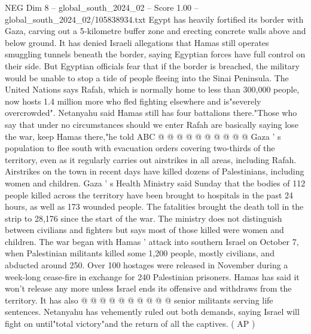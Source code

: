 \begin{textsample}{NEG Dim 8 – global\_south\_2024\_02 – Score 1.00 – global\_south\_2024\_02/105838934.txt}
Egypt has heavily fortified its border with Gaza, carving out a 5-kilometre buffer zone and erecting concrete walls above and below ground.
It has denied Israeli allegations that Hamas still operates smuggling tunnels beneath the border, saying Egyptian forces have full control on their side.
But Egyptian officials fear that if the border is breached, the military would be unable to stop a tide of people fleeing into the Sinai Peninsula.
The United Nations says Rafah, which is normally home to less than 300,000 people, now hosts 1.4 million more who fled fighting elsewhere and is"severely overcrowded".
Netanyahu said Hamas still has four battalions there."Those who say that under no circumstances should we enter Rafah are basically saying lose the war, keep Hamas there,"he told ABC @ @ @ @ @ @ @ @ @ @ Gaza ' s population to flee south with evacuation orders covering two-thirds of the territory, even as it regularly carries out airstrikes in all areas, including Rafah.
Airstrikes on the town in recent days have killed dozens of Palestinians, including women and children.
Gaza ' s Health Ministry said Sunday that the bodies of 112 people killed across the territory have been brought to hospitals in the past 24 hours, as well as 173 wounded people.
The fatalities brought the death toll in the strip to 28,176 since the start of the war.
The ministry does not distinguish between civilians and fighters but says most of those killed were women and children.
The war began with Hamas ' attack into southern Israel on October 7, when Palestinian militants killed some 1,200 people, mostly civilians, and abducted around 250.
Over 100 hostages were released in November during a week-long cease-fire in exchange for 240 Palestinian prisoners.
Hamas has said it won't release any more unless Israel ends its offensive and withdraws from the territory.
It has also @ @ @ @ @ @ @ @ @ @ senior militants serving life sentences.
Netanyahu has vehemently ruled out both demands, saying Israel will fight on until"total victory"and the return of all the captives. ( AP )

\end{textsample}
